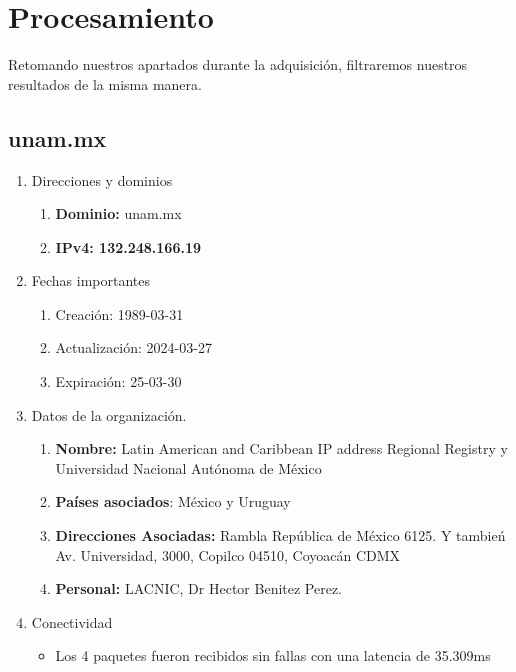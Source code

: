 \section{Procesamiento}
Retomando nuestros apartados durante la adquisición, filtraremos nuestros resultados de la misma manera.

\subsection{unam.mx}

\begin{enumerate}
    \item Direcciones y dominios
    \begin{enumerate}
        \item \textbf{Dominio:} unam.mx
        \item \textbf{IPv4: 132.248.166.19}
    \end{enumerate}
    \item Fechas importantes
    \begin{enumerate}
        \item Creación: 1989-03-31
        \item Actualización: 2024-03-27
        \item Expiración: 25-03-30
    \end{enumerate}
    \item Datos de la organización.

    \begin{enumerate}
        \item \textbf{Nombre:} Latin American and Caribbean IP address Regional Registry y Universidad Nacional Autónoma de México
        \item \textbf{Países asociados}: México y Uruguay
        \item \textbf{Direcciones Asociadas:} Rambla República de México 6125. Y tambień Av. Universidad, 3000, Copilco 04510, Coyoacán CDMX
        \item \textbf{Personal:} LACNIC, Dr Hector Benitez Perez.
    \end{enumerate}

    \item Conectividad
    \begin{itemize}
        \item Los 4 paquetes fueron recibidos sin fallas con una latencia de 35.309ms
    \end{itemize}


\end{enumerate}
